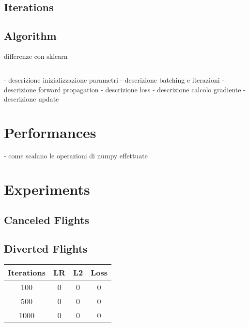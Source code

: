 \documentclass[
	letterpaper, %
	10pt, %
]{class}
\begin{document}
\subsection{Iterations}

\subsection{Algorithm}

differenze con sklearn


\subsection{}
- descrizione inizializzazione parametri
- descrizione batching e iterazioni
- descrizione forward propagation
- descrizione loss
- descrizione calcolo gradiente
- descrizione update


\section{Performances}

- come scalano le operazioni di numpy effettuate


\section{Experiments}

\subsection{Canceled Flights}

\subsection{Diverted Flights}

\begin{center}
	\begin{tabular}{ |c|c|c|c| }
		\hline
		Iterations & LR & L2 & Loss \\
		\hline
		100        & 0  & 0  & 0    \\
		500        & 0  & 0  & 0    \\
		1000       & 0  & 0  & 0    \\
		\hline
	\end{tabular}
\end{center}
\end{document}

